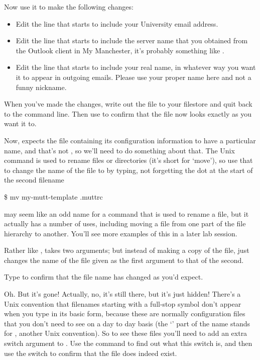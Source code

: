Now use it to make the following changes:

\begin{itemize}
\item Edit the line that starts  to include your University email address.
\item Edit the line that starts  to include the server name that you obtained from the Outlook client in My Manchester, it's probably something like .
\item Edit the line that starts  to include your real name, in whatever way you want it to appear in outgoing emails. Please use your proper name here and not a funny nickname.
\end{itemize}

When you've made the changes, write out the file to your filestore and quit back to the command line. Then use  to confirm that the file now looks exactly as you want it to. 

Now,  expects the file containing its configuration information to have a particular name, and that's not , so we'll need to do something about that. The Unix  command is used to rename files or directories (it's short for `move'), so use that to change the name of the file to  by typing, not forgetting the dot at the start of the second filename


\begin{ttoutenv}
\$ mv my-mutt-template .muttrc
\end{ttoutenv}


 may seem like an odd name for a command that is used to rename a file, but it actually has a number of uses, including moving a file from one part of the file hierarchy to another. You'll see more examples of this in a later lab session.

Rather like ,  takes two arguments; but instead of making a copy of the file,  just changes the name of the file given as the first argument to that of the second. 

Type  to confirm that the file name has changed as you'd expect. 

Oh. But it's gone! Actually, no, it's still there, but it's just hidden! There's a Unix convention that filenames  starting with a full-stop symbol don't appear when you type  in its basic form, because these are normally configuration files that you don't need to see on a day to day basis (the `' part of the  name stands for , another Unix convention). So to see these files you'll need to add an extra switch argument to . Use the  command to find out what this switch is, and then use the switch to confirm that the  file does indeed exist. 

